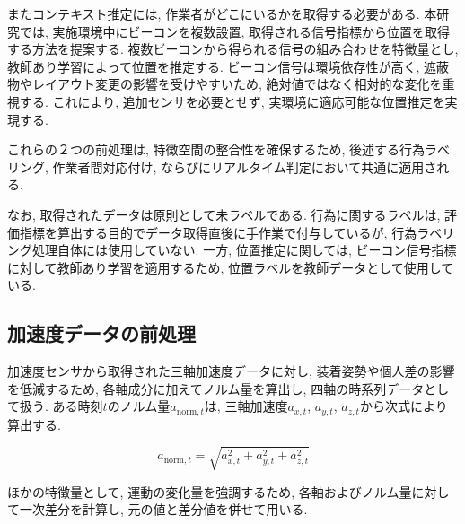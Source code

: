 \documentclass[a4paper,12pt]{jreport}
\begin{document}
またコンテキスト推定には, 作業者がどこにいるかを取得する必要がある. 本研究では, 実施環境中にビーコンを複数設置, 取得される信号指標から位置を取得する方法を提案する. 複数ビーコンから得られる信号の組み合わせを特徴量とし, 教師あり学習によって位置を推定する. ビーコン信号は環境依存性が高く, 遮蔽物やレイアウト変更の影響を受けやすいため, 絶対値ではなく相対的な変化を重視する. これにより, 追加センサを必要とせず, 実環境に適応可能な位置推定を実現する. 

これらの２つの前処理は, 特徴空間の整合性を確保するため, 後述する行為ラベリング, 作業者間対応付け, ならびにリアルタイム判定において共通に適用される. 

なお, 取得されたデータは原則として未ラベルである. 行為に関するラベルは, 評価指標を算出する目的でデータ取得直後に手作業で付与しているが, 行為ラベリング処理自体には使用していない. 一方, 位置推定に関しては, ビーコン信号指標に対して教師あり学習を適用するため, 位置ラベルを教師データとして使用している. 


\subsection{加速度データの前処理}
加速度センサから取得された三軸加速度データに対し, 装着姿勢や個人差の影響を低減するため, 各軸成分に加えてノルム量を算出し, 四軸の時系列データとして扱う. ある時刻$t$のノルム量$a_{\mathrm{norm},t}$は, 三軸加速度$a_{x,t}$, $a_{y,t}$, $a_{z,t}$から次式により算出する.

\begin{equation}
a_{\mathrm{norm},t}=\sqrt{a_{x,t}^2+a_{y,t}^2+a_{z,t}^2}
\end{equation}

ほかの特徴量として, 運動の変化量を強調するため, 各軸およびノルム量に対して一次差分を計算し, 元の値と差分値を併せて用いる.
\end{document}
